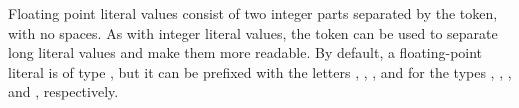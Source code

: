 Floating point literal values consist of two integer parts separated by the
 token, with no spaces. As with integer literal values, the \token{\_}
token can be used to separate long literal values and make them more readable.
By default, a floating-point literal is of type , but it can be
prefixed with the letters , , , and  for the
types , , , and , respectively.

